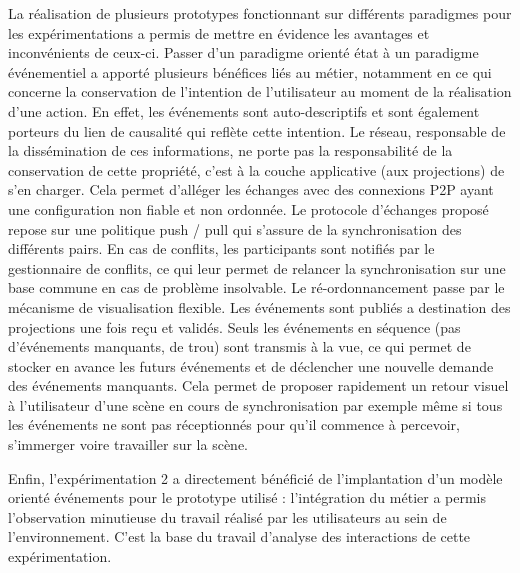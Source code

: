 La réalisation de plusieurs prototypes fonctionnant sur différents 
paradigmes pour les expérimentations a permis de mettre en évidence les 
avantages et inconvénients de ceux-ci.
Passer d'un paradigme orienté état à un paradigme événementiel a apporté
plusieurs bénéfices liés au métier, notamment en ce qui concerne la conservation 
de l'intention de l'utilisateur au moment de la réalisation d'une action. En effet, les 
événements sont auto-descriptifs et sont également porteurs du lien de causalité 
qui reflète cette intention. Le réseau, responsable de la dissémination de ces 
informations, ne porte pas la responsabilité de la conservation de cette propriété, 
c'est à la couche applicative (aux projections) de s'en charger. 
Cela permet d'alléger les échanges 
avec des connexions \gls{P2P} ayant une configuration non fiable et non 
ordonnée. Le protocole d'échanges proposé repose sur une politique push / pull qui 
s'assure de la synchronisation des différents pairs. En cas de conflits, les 
participants sont notifiés par le gestionnaire de conflits, ce qui leur permet de 
relancer la synchronisation sur une base commune en cas de problème insolvable. 
Le ré-ordonnancement passe par le mécanisme de visualisation flexible. Les 
événements sont publiés a destination des projections une fois reçu et validés. 
Seuls les événements en séquence (pas d'événements manquants, de \og 
trou\fg{}) sont transmis à la vue, ce qui permet de stocker en avance les futurs 
événements et de déclencher une nouvelle demande des événements manquants. 
Cela permet de proposer rapidement un retour visuel à l'utilisateur d'une scène en 
cours de synchronisation par exemple même si tous les événements ne sont pas 
réceptionnés pour qu'il commence à percevoir, s'immerger voire travailler sur la 
scène.

Enfin, l'expérimentation 2 a directement bénéficié de l'implantation d'un modèle 
orienté événements pour le prototype utilisé : l'intégration du métier a permis 
l'observation minutieuse du travail réalisé par les utilisateurs au sein de 
l'environnement. C'est la base du travail d'analyse des interactions de cette 
expérimentation.

